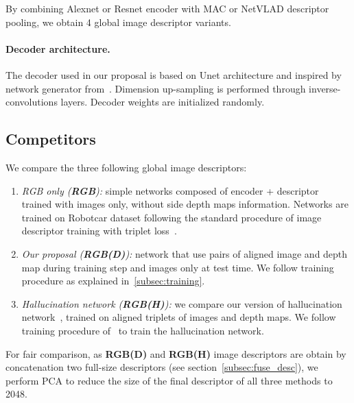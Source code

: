 By combining Alexnet or Resnet encoder with MAC or NetVLAD descriptor pooling, we obtain 4 global image descriptor variants.

\paragraph{Decoder architecture.}
The decoder used in our proposal is based on Unet architecture and inspired by network generator from~\cite{Isola2017}. Dimension up-sampling is performed through inverse-convolutions layers. Decoder weights are initialized randomly.

\subsection{Competitors}
\label{subsec:competitors}
We compare the three following global image descriptors:
\begin{enumerate}
    \item \textit{RGB only (\textbf{RGB}):} simple networks composed of encoder + descriptor trained with images only, without side depth maps information. Networks are trained on Robotcar dataset following the standard procedure of image descriptor training with triplet loss~\cite{Arandjelovic2017, Radenovic2017}.
    \item \textit{Our proposal (\textbf{RGB(D)}):} network that use pairs of aligned image and depth map during training step and images only at test time. We follow training procedure as explained in~\ref{subsec:training}.
	\item \textit{Hallucination network (\textbf{RGB(H)}):} we compare our version of hallucination network~\cite{Hoffman2016}, trained on aligned triplets of images and depth maps. We follow training procedure of~\cite{Hoffman2016} to train the hallucination network.
\end{enumerate}

For fair comparison, as \textbf{RGB(D)} and \textbf{RGB(H)} image descriptors are obtain by concatenation two full-size descriptors (see section~\ref{subsec:fuse_desc}), we perform PCA to reduce the size of the final descriptor of all three methods to 2048.